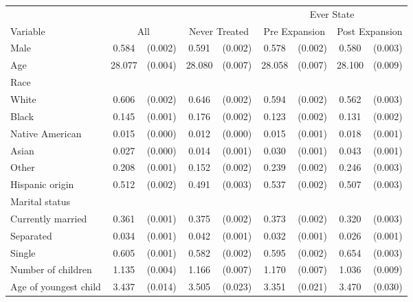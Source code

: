 \begin{tabular}{lcccccccc}
\toprule
\toprule
  & & & & & \multicolumn{4}{c}{Ever State} \\
 Variable & \multicolumn{2}{c}{All} & \multicolumn{2}{c}{Never Treated} & \multicolumn{2}{c}{Pre Expansion} & \multicolumn{2}{c}{Post Expansion} \\
\midrule 
 Male   & 0.584 & (0.002)  & 0.591 & (0.002)  & 0.578 & (0.002)  & 0.580 & (0.003)  \\
 Age   & 28.077 & (0.004)  & 28.080 & (0.007)  & 28.058 & (0.007)  & 28.100 & (0.009)  \\
 Race   & & & & & \\
 \hspace{0.3cm}  White   & 0.606 & (0.002)  & 0.646 & (0.002)  & 0.594 & (0.002)  & 0.562 & (0.003)  \\
 \hspace{0.3cm}  Black   & 0.145 & (0.001)  & 0.176 & (0.002)  & 0.123 & (0.002)  & 0.131 & (0.002)  \\
 \hspace{0.3cm}  Native American   & 0.015 & (0.000)  & 0.012 & (0.000)  & 0.015 & (0.001)  & 0.018 & (0.001)  \\
 \hspace{0.3cm}  Asian   & 0.027 & (0.000)  & 0.014 & (0.001)  & 0.030 & (0.001)  & 0.043 & (0.001)  \\
 \hspace{0.3cm}  Other   & 0.208 & (0.001)  & 0.152 & (0.002)  & 0.239 & (0.002)  & 0.246 & (0.003)  \\
 Hispanic origin   & 0.512 & (0.002)  & 0.491 & (0.003)  & 0.537 & (0.002)  & 0.507 & (0.003)  \\
 Marital status   & & & & & \\
 \hspace{0.3cm} Currently married   & 0.361 & (0.001)  & 0.375 & (0.002)  & 0.373 & (0.002)  & 0.320 & (0.003)  \\
 \hspace{0.3cm} Separated   & 0.034 & (0.001)  & 0.042 & (0.001)  & 0.032 & (0.001)  & 0.026 & (0.001)  \\
 \hspace{0.3cm} Single   & 0.605 & (0.001)  & 0.582 & (0.002)  & 0.595 & (0.002)  & 0.654 & (0.003)  \\
 Number of children   & 1.135 & (0.004)  & 1.166 & (0.007)  & 1.170 & (0.007)  & 1.036 & (0.009)  \\
 Age of youngest child   & 3.437 & (0.014)  & 3.505 & (0.023)  & 3.351 & (0.021)  & 3.470 & (0.030)  \\

\end{tabular}
